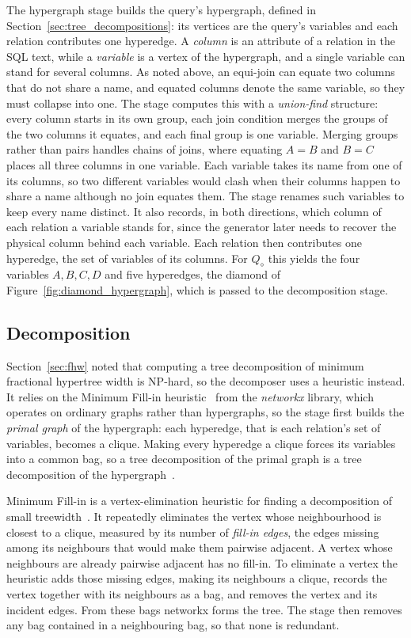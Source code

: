 The hypergraph stage builds the query's hypergraph, defined in Section~\ref{sec:tree_decompositions}: its vertices are the query's variables and each relation contributes one hyperedge.
A \emph{column} is an attribute of a relation in the SQL text, while a \emph{variable} is a vertex of the hypergraph, and a single variable can stand for several columns.
As noted above, an equi-join can equate two columns that do not share a name, and equated columns denote the same variable, so they must collapse into one.
The stage computes this with a \emph{union-find} structure: every column starts in its own group, each join condition merges the groups of the two columns it equates, and each final group is one variable.
Merging groups rather than pairs handles chains of joins, where equating $A=B$ and $B=C$ places all three columns in one variable.
Each variable takes its name from one of its columns, so two different variables would clash when their columns happen to share a name although no join equates them.
The stage renames such variables to keep every name distinct.
It also records, in both directions, which column of each relation a variable stands for, since the generator later needs to recover the physical column behind each variable.
Each relation then contributes one hyperedge, the set of variables of its columns.
For $Q_\diamond$ this yields the four variables $A,B,C,D$ and five hyperedges, the diamond of Figure~\ref{fig:diamond_hypergraph}, which is passed to the decomposition stage.

\subsection{Decomposition}

Section~\ref{sec:fhw} noted that computing a tree decomposition of minimum fractional hypertree width is NP-hard, so the decomposer uses a heuristic instead.
It relies on the Minimum Fill-in heuristic~\cite{bodlaender2005} from the \emph{networkx} library, which operates on ordinary graphs rather than hypergraphs, so the stage first builds the \emph{primal graph} of the hypergraph: each hyperedge, that is each relation's set of variables, becomes a clique.
Making every hyperedge a clique forces its variables into a common bag, so a tree decomposition of the primal graph is a tree decomposition of the hypergraph~\cite{grohe2014}.

Minimum Fill-in is a vertex-elimination heuristic for finding a decomposition of small treewidth~\cite{bodlaender2005}.
It repeatedly eliminates the vertex whose neighbourhood is closest to a clique, measured by its number of \emph{fill-in edges}, the edges missing among its neighbours that would make them pairwise adjacent.
A vertex whose neighbours are already pairwise adjacent has no fill-in.
To eliminate a vertex the heuristic adds those missing edges, making its neighbours a clique, records the vertex together with its neighbours as a bag, and removes the vertex and its incident edges.
From these bags networkx forms the tree.
The stage then removes any bag contained in a neighbouring bag, so that none is redundant.

